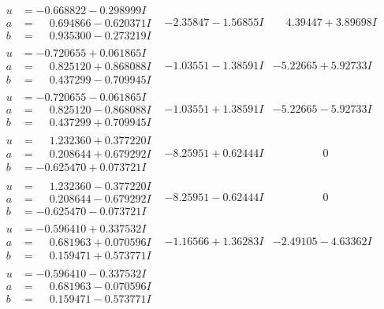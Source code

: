 \documentclass[1p]{elsarticle_modified}
\theoremstyle{definition}
\begin{document}
$$\begin{array}{c|c|c}
\begin{aligned}
u &= -0.668822 - 0.298999 I \\
a &= \phantom{-}0.694866 - 0.620371 I \\
b &= \phantom{-}0.935300 - 0.273219 I\end{aligned}
 & -2.35847 - 1.56855 I & \phantom{-}4.39447 + 3.89698 I \\ \hline\begin{aligned}
u &= -0.720655 + 0.061865 I \\
a &= \phantom{-}0.825120 + 0.868088 I \\
b &= \phantom{-}0.437299 - 0.709945 I\end{aligned}
 & -1.03551 - 1.38591 I & -5.22665 + 5.92733 I \\ \hline\begin{aligned}
u &= -0.720655 - 0.061865 I \\
a &= \phantom{-}0.825120 - 0.868088 I \\
b &= \phantom{-}0.437299 + 0.709945 I\end{aligned}
 & -1.03551 + 1.38591 I & -5.22665 - 5.92733 I \\ \hline\begin{aligned}
u &= \phantom{-}1.232360 + 0.377220 I \\
a &= \phantom{-}0.208644 + 0.679292 I \\
b &= -0.625470 + 0.073721 I\end{aligned}
 & -8.25951 + 0.62444 I & \phantom{-0.000000 } 0 \\ \hline\begin{aligned}
u &= \phantom{-}1.232360 - 0.377220 I \\
a &= \phantom{-}0.208644 - 0.679292 I \\
b &= -0.625470 - 0.073721 I\end{aligned}
 & -8.25951 - 0.62444 I & \phantom{-0.000000 } 0 \\ \hline\begin{aligned}
u &= -0.596410 + 0.337532 I \\
a &= \phantom{-}0.681963 + 0.070596 I \\
b &= \phantom{-}0.159471 + 0.573771 I\end{aligned}
 & -1.16566 + 1.36283 I & -2.49105 - 4.63362 I \\ \hline\begin{aligned}
u &= -0.596410 - 0.337532 I \\
a &= \phantom{-}0.681963 - 0.070596 I \\
b &= \phantom{-}0.159471 - 0.573771 I\end{aligned}

\end{array}$$
\end{document}
